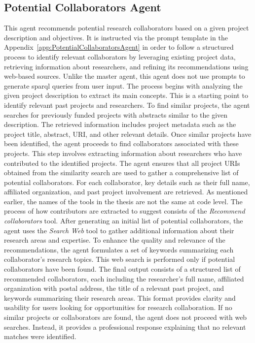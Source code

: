 \subsection*{Potential Collaborators Agent}
This agent recommends potential research collaborators based on a given project description and objectives.
It is instructed via the prompt template in the Appendix~\ref{app:PotentialCollaboratorsAgent} in order to follow a structured process to identify relevant collaborators by leveraging existing project data, retrieving information about researchers, and refining its recommendations using web-based sources.
Unlike the master agent, this agent does not use prompts to generate \gls{sparql} queries from user input.
The process begins with analyzing the given project description to extract its main concepts.
This is a starting point to identify relevant past projects and researchers.
To find similar projects, the agent searches for previously funded projects with abstracts similar to the given description.
The retrieved information includes project metadata such as the project title, abstract, URI, and other relevant details.
Once similar projects have been identified, the agent proceeds to find collaborators associated with these projects.
This step involves extracting information about researchers who have contributed to the identified projects.
The agent ensures that all project URIs obtained from the similarity search are used to gather a comprehensive list of potential collaborators.
For each collaborator, key details such as their full name, affiliated organization, and past project involvement are retrieved.
As mentioned earlier, the names of the tools in the thesis are not the same at code level. The process of how contributors are extracted to suggest consists of the \textit{Recommend collaborators} tool.
After generating an initial list of potential collaborators, the agent uses the \textit{Search Web} tool to gather additional information about their research areas and expertise.
To enhance the quality and relevance of the recommendations, the agent formulates a set of keywords summarizing each collaborator's research topics.
This web search is performed only if potential collaborators have been found.
The final output consists of a structured list of recommended collaborators, each including the researcher's full name, affiliated organization with postal address, the title of a relevant past project, and keywords summarizing their research areas.
This format provides clarity and usability for users looking for opportunities for research collaboration.
If no similar projects or collaborators are found, the agent does not proceed with web searches.
Instead, it provides a professional response explaining that no relevant matches were identified.

